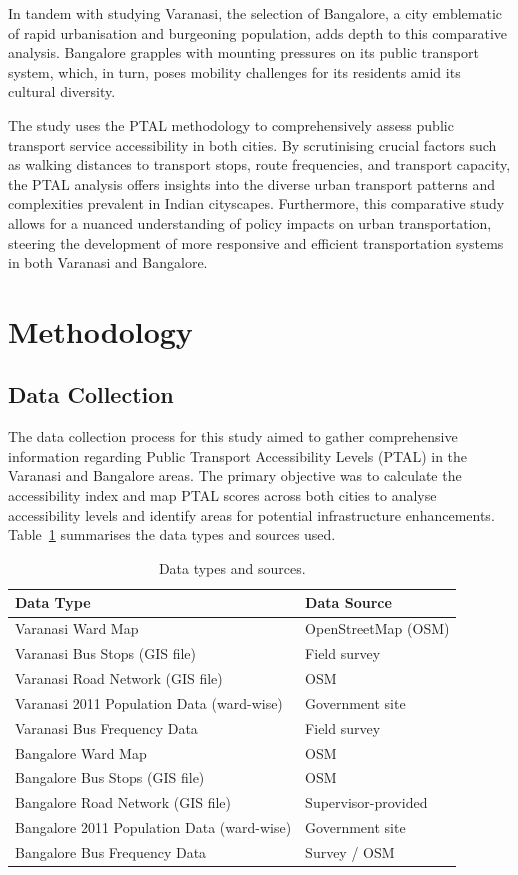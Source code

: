 \documentclass[11pt]{article}
\begin{document}
In tandem with studying Varanasi, the selection of Bangalore, a city emblematic of rapid
urbanisation and burgeoning population, adds depth to this comparative analysis. Bangalore
grapples with mounting pressures on its public transport system, which, in turn, poses mobility
challenges for its residents amid its cultural diversity.

The study uses the PTAL methodology to comprehensively assess public transport service
accessibility in both cities. By scrutinising crucial factors such as walking distances to
transport stops, route frequencies, and transport capacity, the PTAL analysis offers insights
into the diverse urban transport patterns and complexities prevalent in Indian cityscapes.
Furthermore, this comparative study allows for a nuanced understanding of policy impacts on
urban transportation, steering the development of more responsive and efficient transportation
systems in both Varanasi and Bangalore.

\section{Methodology}

\subsection{Data Collection}

The data collection process for this study aimed to gather comprehensive information regarding
Public Transport Accessibility Levels (PTAL) in the Varanasi and Bangalore areas. The primary
objective was to calculate the accessibility index and map PTAL scores across both cities to
analyse accessibility levels and identify areas for potential infrastructure enhancements.
Table~\ref{tab:datasources} summarises the data types and sources used.

\begin{table}[H]
\centering
\caption{Data types and sources.}
\label{tab:datasources}
\small
\begin{tabular}{p{7cm}p{5cm}}
\toprule
\textbf{Data Type} & \textbf{Data Source} \\
\midrule
Varanasi Ward Map & OpenStreetMap (OSM) \\
Varanasi Bus Stops (GIS file) & Field survey \\
Varanasi Road Network (GIS file) & OSM \\
Varanasi 2011 Population Data (ward-wise) & Government site \\
Varanasi Bus Frequency Data & Field survey \\
Bangalore Ward Map & OSM \\
Bangalore Bus Stops (GIS file) & OSM \\
Bangalore Road Network (GIS file) & Supervisor-provided \\
Bangalore 2011 Population Data (ward-wise) & Government site \\
Bangalore Bus Frequency Data & Survey / OSM \\
\bottomrule
\end{tabular}
\end{table}
\end{document}
